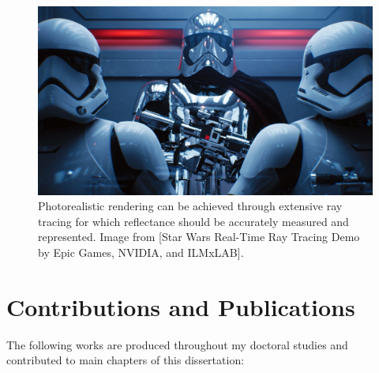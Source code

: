 \begin{figure}[ht]
  \centering

    \includegraphics[width=0.78\linewidth]{Images/StarWars-RayTracing.jpeg}

   \caption{Photorealistic rendering can be achieved through extensive ray tracing for which reflectance should be accurately measured and represented. Image from [Star Wars Real-Time Ray Tracing Demo by Epic Games, NVIDIA, and ILMxLAB].}
   \label{fig:brdf-intro}
\end{figure}



\section{Contributions and Publications}

The following works are produced throughout my doctoral studies and contributed to main chapters of this dissertation:

